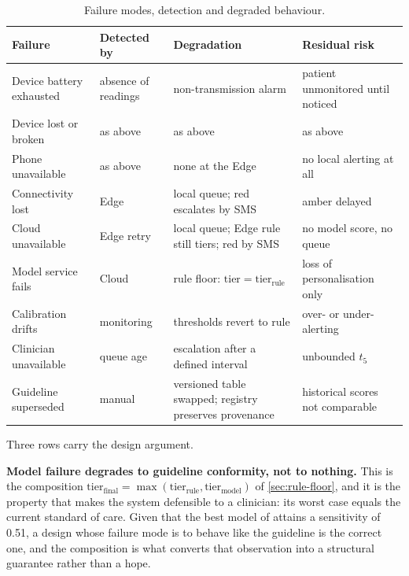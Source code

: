 \documentclass[12pt,a4paper,oneside]{report}
\begin{document}
\begin{table}[htbp]
\centering\footnotesize
\caption{Failure modes, detection and degraded behaviour.}\label{tab:failure-modes}
\begin{tabularx}{\textwidth}{@{}>{\raggedright\arraybackslash}p{2.9cm} >{\raggedright\arraybackslash}p{2.3cm} X >{\raggedright\arraybackslash}p{3.0cm}@{}}
\toprule
\textbf{Failure} & \textbf{Detected by} & \textbf{Degradation} & \textbf{Residual risk} \\
\midrule
Device battery exhausted & absence of readings & non-transmission alarm & patient unmonitored until noticed \\
Device lost or broken & as above & as above & as above \\
Phone unavailable & as above & none at the Edge & no local alerting at all \\
Connectivity lost & Edge & local queue; red escalates by SMS & amber delayed \\
Cloud unavailable & Edge retry & local queue; Edge rule still tiers; red by SMS & no model score, no queue \\
Model service fails & Cloud & rule floor: $\text{tier}=\text{tier}_{\text{rule}}$ & loss of personalisation only \\
Calibration drifts & monitoring & thresholds revert to rule & over- or under-alerting \\
Clinician unavailable & queue age & escalation after a defined interval & unbounded $t_5$ \\
Guideline superseded & manual & versioned table swapped; registry preserves provenance & historical scores not comparable \\
\bottomrule
\end{tabularx}
\end{table}

Three rows carry the design argument.

\textbf{Model failure degrades to guideline conformity, not to nothing.} This is the composition $\text{tier}_{\text{final}} = \max(\text{tier}_{\text{rule}}, \text{tier}_{\text{model}})$ of \cref{sec:rule-floor}, and it is the property that makes the system defensible to a clinician: its worst case equals the current standard of care. Given that the best model of \textcite{mendoza2025} attains a sensitivity of 0.51, a design whose failure mode is to behave like the guideline is the correct one, and the composition is what converts that observation into a structural guarantee rather than a hope.
\end{document}
